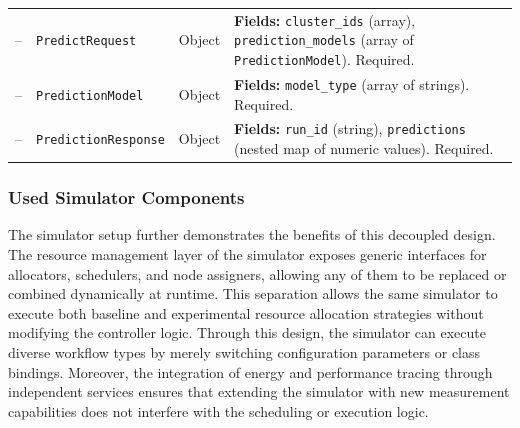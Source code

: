 \begin{table}[H]
{\begin{tabular}{
            p{0.8cm}
            p{5.3cm}
            >{\centering\arraybackslash}p{2cm}
            p{9cm}
            }
            --          & \texttt{PredictRequest}         & Object          &
            \textbf{Fields:} \texttt{cluster\_ids} (array), \texttt{prediction\_models} (array of \texttt{PredictionModel}). Required. \\

            --          & \texttt{PredictionModel}        & Object          &
            \textbf{Fields:} \texttt{model\_type} (array of strings). Required.                                                        \\

            --          & \texttt{PredictionResponse}     & Object          &
            \textbf{Fields:} \texttt{run\_id} (string), \texttt{predictions} (nested map of numeric values). Required.                 \\


            \bottomrule
        \end{tabular}
    }
\end{table}

\subsubsection{Used Simulator Components}
\label{sec:simulator_setup}
The simulator setup further demonstrates the benefits of this decoupled design. The resource management layer of the simulator exposes generic interfaces for allocators, schedulers, and node assigners, allowing any of them to be replaced or combined dynamically at runtime. This separation allows the same simulator to execute both baseline and experimental resource allocation strategies without modifying the controller logic. Through this design, the simulator can execute diverse workflow types by merely switching configuration parameters or class bindings. Moreover, the integration of energy and performance tracing through independent services ensures that extending the simulator with new measurement capabilities does not interfere with the scheduling or execution logic.

